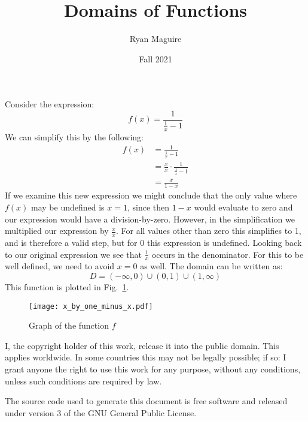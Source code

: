 \documentclass{article}
\title{Domains of Functions}
\author{Ryan Maguire}
\date{Fall 2021}
\begin{document}
    \maketitle
    Consider the expression:
    \begin{equation}
        f(x)=\frac{1}{\frac{1}{x}-1}
    \end{equation}
    We can simplify this by the following:
    \begin{align}
        f(x)&=\frac{1}{\frac{1}{x}-1}\\
            &=\frac{x}{x}\cdot\frac{1}{\frac{1}{x}-1}\\
            &=\frac{x}{1-x}
    \end{align}
    If we examine this new expression we might conclude that the only value
    where $f(x)$ may be undefined is $x=1$, since then $1-x$ would evaluate to
    zero and our expression would have a division-by-zero. However, in the
    simplification we multiplied our expression by $\frac{x}{x}$. For all
    values other than zero this simplifies to 1, and is therefore a valid
    step, but for 0 this expression is undefined. Looking back to our original
    expression we see that $\frac{1}{x}$ occurs in the denominator. For this
    to be well defined, we need to avoid $x=0$ as well. The domain can be
    written as:
    \begin{equation}
        D=(-\infty, 0)\cup(0,1)\cup(1,\infty)
    \end{equation}
    This function is plotted in Fig.~\ref{fig:graph_of_func}.
    \begin{figure}
        \centering
        \texttt{[image: x\_by\_one\_minus\_x.pdf]}
        \caption{Graph of the function $f$}
        \label{fig:graph_of_func}
    \end{figure}
    \newpage
    I, the copyright holder of this work, release it into the public domain.
    This applies worldwide. In some countries this may not be legally possible;
    if so: I grant anyone the right to use this work for any purpose, without
    any conditions, unless such conditions are required by law.
    \par\hfill\par
    The source code used to generate this document is free software and released
    under version 3 of the GNU General Public License.
\end{document}
